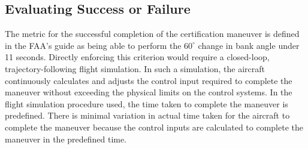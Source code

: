 

\subsection{Evaluating Success or Failure} \label{subsec:success_failure}

The metric for the successful completion of the certification maneuver is defined in the FAA's guide \cite{romanowski_flight_2018} as being able to perform the $60^\circ$ change in bank angle under 11 seconds. 
Directly enforcing this criterion would require a closed-loop, trajectory-following flight simulation. 
In such a simulation, the aircraft continuously calculates and adjusts the control input required to complete the maneuver without exceeding the physical limits on the control systems. 
In the flight simulation procedure used, the time taken to complete the maneuver is predefined.
There is minimal variation in actual time taken for the aircraft to complete the maneuver because the control inputs are calculated to complete the maneuver in the predefined time.

